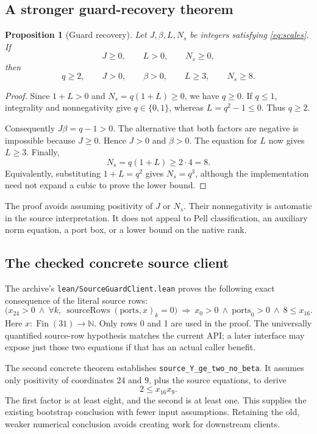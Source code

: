 \documentclass[11pt,letterpaper]{article}
\newcommand{\code}[1]{{\small\urlstyle{tt}\nolinkurl{#1}}}
\newtheorem{proposition}{Proposition}[section]
\begin{document}
\subsection{A stronger guard-recovery theorem}

\begin{proposition}[Guard recovery]
Let $J,\beta,L,N_s$ be integers satisfying \eqref{eq:scales}. If
\[
 J\ge0,\qquad L>0,\qquad N_s\ge0,
\]
then
\[
 q\ge2,\qquad J>0,\qquad \beta>0,\qquad L\ge3,\qquad N_s\ge8.
\]
\end{proposition}

\begin{proof}
Since $1+L>0$ and $N_s=q(1+L)\ge0$, we have $q\ge0$. If $q\le1$, integrality and nonnegativity give $q\in\{0,1\}$, whereas $L=q^2-1\le0$. Thus $q\ge2$.

Consequently $J\beta=q-1>0$. The alternative that both factors are negative is impossible because $J\ge0$. Hence $J>0$ and $\beta>0$. The equation for $L$ now gives $L\ge3$. Finally,
\[
 N_s=q(1+L)\ge2\cdot4=8.
\]
Equivalently, substituting $1+L=q^2$ gives $N_s=q^3$, although the implementation need not expand a cubic to prove the lower bound.
\end{proof}

The proof avoids assuming positivity of $J$ or $N_s$. Their nonnegativity is automatic in the source interpretation. It does not appeal to Pell classification, an auxiliary norm equation, a port box, or a lower bound on the native rank.

\subsection{The checked concrete source client}

The archive's \code{lean/SourceGuardClient.lean} proves the following exact consequence of the literal source rows:
\begin{equation}
 \bigl(x_{24}>0\ \land\ \forall k,\ \operatorname{sourceRows}(\mathrm{ports},x)_k=0\bigr)
 \ \Longrightarrow\ x_0>0\ \land\ \mathrm{ports}_0>0\ \land\ 8\le x_{16}.
 \label{eq:client}
\end{equation}
Here $x:\operatorname{Fin}(31)\to\mathbb N$. Only rows 0 and 1 are used in the proof. The universally quantified source-row hypothesis matches the current API; a later interface may expose just those two equations if that has an actual caller benefit.

The second concrete theorem establishes \code{source_Y_ge_two_no_beta}. It assumes only positivity of coordinates 24 and 9, plus the source equations, to derive
\[
 2\le x_{16}x_9.
\]
The first factor is at least eight, and the second is at least one. This supplies the existing bootstrap conclusion with fewer input assumptions. Retaining the old, weaker numerical conclusion avoids creating work for downstream clients.
\end{document}
